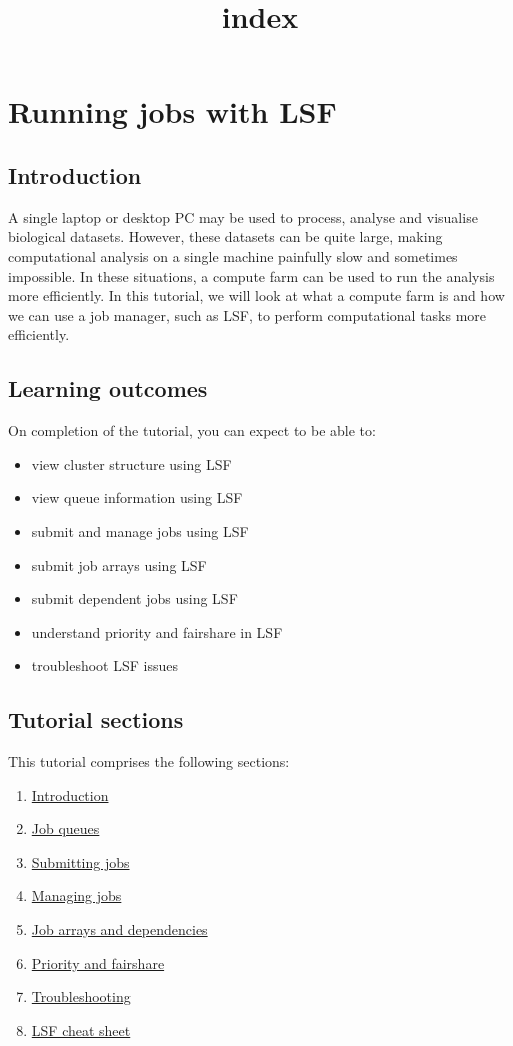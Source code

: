 \documentclass[11pt]{article}
\title{index}
\providecommand{\tightlist}{%
      \setlength{\itemsep}{0pt}\setlength{\parskip}{0pt}}
\begin{document}
    \section{Running jobs with LSF}\label{running-jobs-with-lsf}

\subsection{Introduction}\label{introduction}

A single laptop or desktop PC may be used to process, analyse and
visualise biological datasets. However, these datasets can be quite
large, making computational analysis on a single machine painfully slow
and sometimes impossible. In these situations, a compute farm can be
used to run the analysis more efficiently. In this tutorial, we will
look at what a compute farm is and how we can use a job manager, such as
LSF, to perform computational tasks more efficiently.

\subsection{Learning outcomes}\label{learning-outcomes}

On completion of the tutorial, you can expect to be able to:

\begin{itemize}
\tightlist
\item
  view cluster structure using LSF
\item
  view queue information using LSF
\item
  submit and manage jobs using LSF
\item
  submit job arrays using LSF
\item
  submit dependent jobs using LSF
\item
  understand priority and fairshare in LSF
\item
  troubleshoot LSF issues
\end{itemize}

\subsection{Tutorial sections}\label{tutorial-sections}

This tutorial comprises the following sections:

\begin{enumerate}
\def\labelenumi{\arabic{enumi}.}
\tightlist
\item
  \href{intro.ipynb}{Introduction}
\item
  \href{queues.ipynb}{Job queues}
\item
  \href{submitting_jobs.ipynb}{Submitting jobs}
\item
  \href{managing_jobs.ipynb}{Managing jobs}
\item
  \href{job_arrays.ipynb}{Job arrays and dependencies}
\item
  \href{priority_and_fairshare.ipynb}{Priority and fairshare}
\item
  \href{troubleshooting.ipynb}{Troubleshooting}
\item
  \href{cheat_sheet.ipynb}{LSF cheat sheet}
\end{enumerate}
\end{document}
